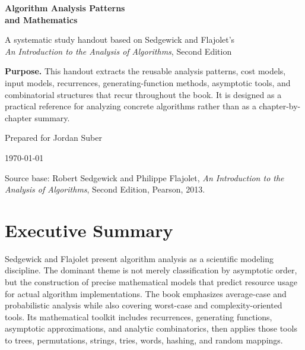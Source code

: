 \documentclass[11pt]{article}
\begin{document}

\begin{titlepage}
  \centering
  \vspace*{0.7in}
  {\Huge\bfseries\color{HouseNavy} Algorithm Analysis Patterns\\[0.15em] and Mathematics\par}
  \vspace{0.3in}
  {\Large A systematic study handout based on Sedgewick and Flajolet's\\ \emph{An Introduction to the Analysis of Algorithms}, Second Edition\par}
  \vspace{0.45in}
  \begin{tcolorbox}[colback=HouseLightBlue,colframe=HouseBlue,width=0.86\textwidth]
  \textbf{Purpose.} This handout extracts the reusable analysis patterns, cost models, input models, recurrences, generating-function methods, asymptotic tools, and combinatorial structures that recur throughout the book. It is designed as a practical reference for analyzing concrete algorithms rather than as a chapter-by-chapter summary.
  \end{tcolorbox}
  \vfill
  {\large Prepared for Jordan Suber\par}
  {\large \today\par}
  \vspace{0.3in}
  {\small Source base: Robert Sedgewick and Philippe Flajolet, \emph{An Introduction to the Analysis of Algorithms}, Second Edition, Pearson, 2013.}
\end{titlepage}
\clearpage
{}

\tableofcontents
\newpage
{}

\section{Executive Summary}

Sedgewick and Flajolet present algorithm analysis as a scientific modeling discipline. The dominant theme is not merely classification by asymptotic order, but the construction of precise mathematical models that predict resource usage for actual algorithm implementations. The book emphasizes average-case and probabilistic analysis while also covering worst-case and complexity-oriented tools. Its mathematical toolkit includes recurrences, generating functions, asymptotic approximations, and analytic combinatorics, then applies those tools to trees, permutations, strings, tries, words, hashing, and random mappings.\cite{SF2013}
\end{document}
